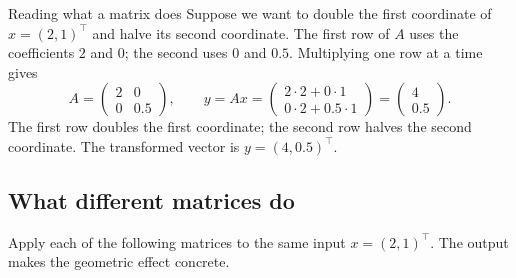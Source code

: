 \begin{framedexample}{Reading what a matrix does}
Suppose we want to double the first coordinate of $x=(2,1)^\top$
and halve its second coordinate. The first row of $A$ uses the
coefficients $2$ and $0$; the second uses $0$ and $0.5$.
Multiplying one row at a time gives
\[
  A=\begin{pmatrix}2&0\\0&0.5\end{pmatrix},\qquad
  y=Ax=\begin{pmatrix}2\cdot2+0\cdot1\\0\cdot2+0.5\cdot1\end{pmatrix}
      =\begin{pmatrix}4\\0.5\end{pmatrix}.
\]
The first row doubles the first coordinate; the second row halves the
second coordinate. The transformed vector is $y=(4,0.5)^\top$.
\end{framedexample}

\subsection{What different matrices do}

Apply each of the following matrices to the same input $x=(2,1)^\top$.
The output makes the geometric effect concrete.

